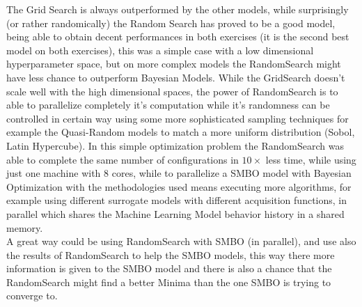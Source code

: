 \documentclass[12pt, onecolumn]{article}
\begin{document}
The Grid Search is always outperformed by the other models, while surprisingly (or rather randomically) the Random Search has proved to be a good model, being able to obtain decent performances in both exercises (it is the second best model on both exercises), this was a simple case with a low dimensional hyperparameter space, but on more complex models the RandomSearch might have less chance to outperform Bayesian Models.
While the GridSearch doesn't scale well with the high dimensional spaces, the power of RandomSearch is to able to parallelize completely it's computation while it's randomness can be controlled in certain way using some more sophisticated sampling techniques for example the Quasi-Random models to match a more uniform distribution (Sobol, Latin Hypercube).
In this simple optimization problem the RandomSearch was able to complete the same number of configurations in $10\times$ less time, while using just one machine with 8 cores, while to parallelize a SMBO model with Bayesian Optimization with the methodologies used means executing more algorithms, for example using different surrogate models with different acquisition functions, in parallel which shares the Machine Learning Model behavior history in a shared memory.\\
A great way could be using RandomSearch with SMBO (in parallel), and use also the results of RandomSearch to help the SMBO models, this way there more information is given to the SMBO model and there is also a chance that the RandomSearch might find a better Minima than the one SMBO is trying to converge to.
\end{document}
